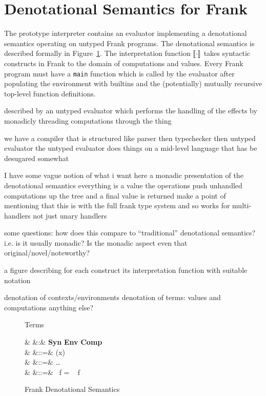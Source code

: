 \section{Denotational Semantics for Frank}
\label{sec:denote}

The prototype interpreter contains an evaluator implementing a denotational
semantics operating on untyped Frank programs. The denotational semantics is
described formally in Figure~\ref{fig:frank-deno-sem}. The interpretation
function $\llbracket{\cdot}\rrbracket$ takes syntactic constructs in Frank to the domain of
computations and values. Every Frank program must have a \verb!main! function
which is called by the evaluator after populating the environment with
builtins and the (potentially) mutually recursive top-level function
definitions.

described by an untyped
evaluator which performs the handling of the effects by monadicly threading
computations through the thing

we have a compiler that is structured like parser then typechecker
then untyped evaluator the untyped evaluator does things on a
mid-level language that has be desugared somewhat

I have some vague notion of what i want here a monadic presentation of the
denotational semantics everything is a value the operations push unhandled
computations up the tree and a final value is returned make a point of
mentioning that this is with the full frank type system and so works for
multi-handlers not just unary handlers

some questions: how does this compare to ``traditional'' denotational
semantics? i.e. is it usually monadic? Is the monadic aspect even that
original/novel/noteworthy?

a figure describing for each construct its interpretation function with
suitable notation

denotation of contexts/environments
denotation of terms: values and computations
anything else?

\begin{figure}[float]
Terms
\begin{syntax}
& \sem{\cdots} &:& \textbf{Syn} \longrightarrow
 \textbf{Env} \longrightarrow \textbf{Comp} \\
&               &::=& \rho(x) \\
&                &::=& \ldots \\
&  &::=& ~f = ~ f~
\end{syntax}

\caption{Frank Denotational Semantics}
\label{fig:frank-deno-sem}
\end{figure}

